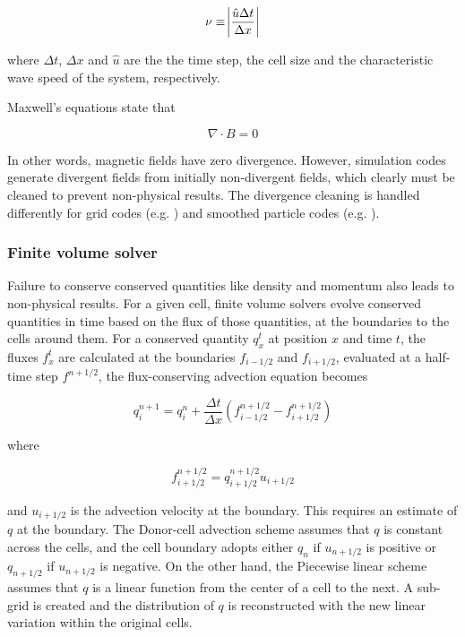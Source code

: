 \documentclass[11pt]{article}
\begin{document}
\begin{equation}
\nu \equiv \abs{\frac{\hat{u}\Delta t}{ \Delta x} }
\end{equation}

 where $\Delta t$, $\Delta x$ and $\hat{u}$ are the  the time step, the cell size and the characteristic wave speed of the system, respectively.
 
Maxwell's equations state that 
 
 \begin{equation}
\nabla \cdot B = 0\label{eq:divb}
\end{equation}

In other words, magnetic fields have zero divergence. However, simulation codes generate divergent fields from initially non-divergent fields, which clearly must be cleaned to prevent non-physical results. The divergence cleaning is handled differently for grid codes (e.g. \citealt{Jiang2012}) and smoothed particle codes (e.g. \citealt{Ziegler2006}).

\subsubsection{Finite volume solver}
\label{sub:finite}
Failure to conserve conserved quantities like density and momentum also leads to non-physical results. For a given cell, finite volume solvers evolve conserved quantities in time based on the flux of those quantities, at the boundaries to the cells around them. For a conserved quantity $q_{x}^{t}$ at position $x$ and time $t$, the fluxes $f_{x}^{t}$ are calculated at the boundaries $f_{i-1/2}$ and $f_{i+1/2}$, evaluated at a half-time step $f^{n+1/2}$, the flux-conserving advection equation becomes 

 \begin{equation}
q_{i}^{n+1}=q_{i}^{n} + \frac{\Delta t}{\Delta{x}}(f_{i-1/2}^{n+1/2}-f_{i+1/2}^{n+1/2}) \label{eq:advect}
\end{equation}

where 

\begin{equation}
 f_{i+1/2}^{n+1/2}= q_{i+1/2}^{n+1/2}u_{i+1/2}\label{eq:advect2}
\end{equation}

and $u_{i+1/2}$ is the advection velocity at the boundary. This requires an estimate of $q$ at the boundary. The Donor-cell advection scheme assumes that $q$ is constant across the cells, and the cell boundary adopts either $q_{n}$ if $u_{n+1/2}$ is positive or $q_{n+1/2}$ if $u_{n+1/2}$ is negative. On the other hand, the Piecewise linear scheme assumes that $q$ is a linear function from the center of a cell to the next. A sub-grid is created and the distribution of $q$ is reconstructed with the new linear variation within the original cells.
\end{document}
